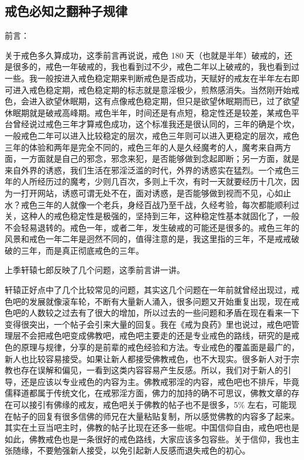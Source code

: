\subsection{戒色必知之翻种子规律}

前言：

关于戒色多久算成功，这季前言再说说，戒色 180 天（也就是半年）破戒的，还是很多的，戒色一年破戒的，我也看到过不少，戒色二年以上破戒的，我也看到过一些。我一般按进入戒色稳定期来判断戒色是否成功，天赋好的戒友在半年左右即可进入戒色稳定期，戒色稳定期的标志就是意淫极少，煎熬感消失。当然刚开始戒色，会进入欲望休眠期，这有点像戒色稳定期，但只是欲望休眠期而已，过了欲望休眠期就是破戒高峰期。戒色半年，时间还是有点短，稳定性还是较差，某戒色平台曾经说过戒色三年才算戒色成功，这个标准我还是很认同的，三年的确是个坎，一般戒色二年可以进入比较稳定的层次，戒色三年则可以进入更稳定的层次，戒色三年的体验和两年是完全不同的，戒色三年的人是久经魔考的人，魔考来自两方面，一方面就是自己的邪念，邪念来犯，是否能够做到念起即断；另一方面，就是来自外界的诱惑，我们生活在邪淫泛滥的时代，外界的诱惑实在猛烈。一个戒色三年的人所经历过的魔考，少则几百次，多则上千次，有时一天就要经历十几次，因为一打开网站，诱惑可谓无处不在，面对诱惑，是否能够做到视而不见，心如止水？戒色三年的人就像一个老兵，身经百战乃至千战，久经考验，每次都能顺利过关，这种人的戒色稳定性是极强的，坚持到三年，这种稳定性基本就固化了，一般不会轻易退转的。戒色一年，或者二年，发生破戒的可能还是很多的。戒色三年的风景和戒色一年二年是迥然不同的，值得注意的是，我这里指的三年，不是戒戒破破的三年，而是真正彻底戒色的三年。

上季轩辕七郎反映了几个问题，这季前言讲一讲。

轩辕正好点中了几个比较常见的问题，其实这几个问题在一年前就曾经出现过，戒色吧的发展就像滚车轮，不断有大量新人涌入，很多问题又开始重复出现，现在戒色吧的人数较之过去有了很大的增加，所以过去的一些问题和矛盾在现在看来一下变得很突出，一个帖子会引来大量的回复。我在《戒为良药》里也说过，戒色吧管理层不会把戒色吧变成佛教吧，戒色吧主要走的还是专业戒色的路线，研究的是戒色的原理与规律，分享的是前辈的戒色经验和方法。专业戒色的覆盖面是最广的，新人也比较容易接受。如果让新人都接受佛教戒色，也不大现实。很多新人对于宗教也存在误解和偏见，一看到这类内容容易产生反感。所以，我们对于新人的引导，还是应该以专业戒色的内容为主。佛教戒邪淫的内容，戒色吧也不排斥，毕竟儒释道都属于传统文化，在戒邪淫方面，佛力的加持的确不可思议，佛教文章的存在可以接引有佛缘的戒友，戒色吧关于佛教的帖子也不是很多，5\% 左右，可能现在帖子的回复有很多信佛的师兄在大量粘贴复制，所以感觉佛教的内容多了起来。其实在土豆当吧主时，佛教的帖子比现在还多一些呢。中国信仰自由，戒色吧也是如此，佛教戒色也是一条很好的戒色路线，大家应该多包容些。关于信仰，我也主张随缘，不要勉强新人接受，以免引起新人反感而退失戒色的初心。

